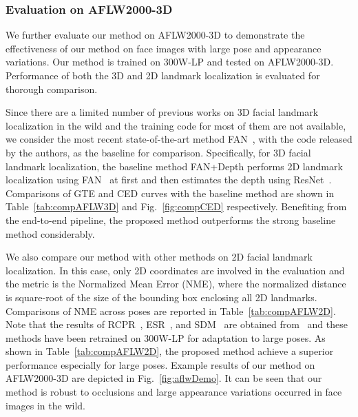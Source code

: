 \documentclass[a4paper,conference]{IEEEtran}
\begin{document}
\subsubsection{Evaluation on AFLW2000-3D}

We further evaluate our method on AFLW2000-3D to demonstrate the effectiveness of our method on face images with large pose and appearance variations.
Our method is trained on 300W-LP and tested on AFLW2000-3D.
Performance of both the 3D and 2D landmark localization is evaluated for thorough comparison.

Since there are a limited number of previous works on 3D facial landmark localization in the wild and the training code for most of them are not available, we consider the most recent state-of-the-art method FAN~\cite{Bulat2017HowFar}, with the code released by the authors, as the baseline for comparison.
Specifically, for 3D facial landmark localization, the baseline method FAN+Depth performs 2D landmark localization using FAN~\cite{Bulat2017HowFar} at first and then estimates the depth using ResNet~\cite{he2016deep}.
Comparisons of GTE and CED curves with the baseline method are shown in Table~\ref{tab:compAFLW3D} and Fig.~\ref{fig:compCED} respectively.
Benefiting from the end-to-end pipeline, the proposed method outperforms the strong baseline method considerably.

We also compare our method with other methods on 2D facial landmark localization.
In this case, only 2D coordinates are involved in the evaluation and the metric is the Normalized Mean Error (NME), where the normalized distance is square-root of the size of the bounding box enclosing all 2D landmarks.
Comparisons of NME across poses are reported in Table~\ref{tab:compAFLW2D}.
Note that the results of RCPR~\cite{burgos2013robust}, ESR~\cite{cao2014face}, and SDM~\cite{xiong2013supervised} are obtained from~\cite{zhu2016face} and these methods have been retrained on 300W-LP for adaptation to large poses.
As shown in Table~\ref{tab:compAFLW2D}, the proposed method achieve a superior performance especially for large poses.
Example results of our method on AFLW2000-3D are depicted in Fig.~\ref{fig:aflwDemo}.
It can be seen that our method is robust to occlusions and large appearance variations occurred in face images in the wild. 
\end{document}
